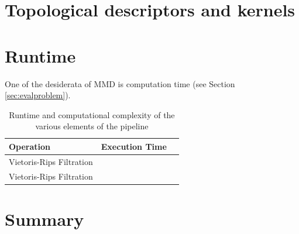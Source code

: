 
\section{Topological descriptors and kernels}

\section{Runtime}

One of the desiderata of MMD is computation time (see Section \ref{sec:evalproblem}).

\begin{table}
  \centering
  \begin{tabular}{lll}
    \toprule
    \textbf{Operation} &  \textbf{Execution Time} \\
    \midrule
    Vietoris-Rips Filtration & \\
    Vietoris-Rips Filtration & \\
    \bottomrule
  \end{tabular}
  \caption{Runtime and computational complexity of the various elements of the pipeline}
  \label{tab:descriptor_function_setup}
\end{table}











\section{Summary}

